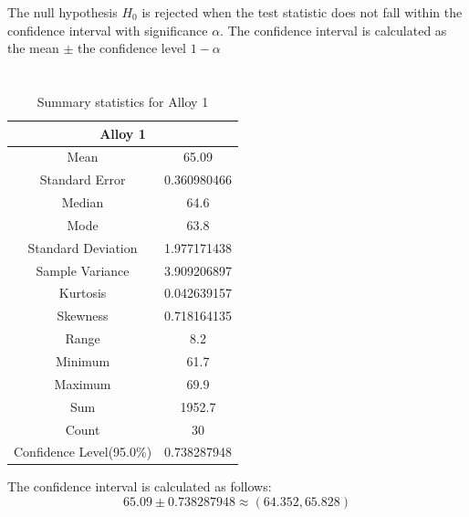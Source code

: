 \documentclass[letterpaper]{article}
\begin{document}
The null hypothesis $H_0$ is rejected when the test statistic
does not fall within the confidence interval with significance $\alpha$.
The confidence interval is calculated as the mean $\pm$ the confidence level $1-\alpha$


\section{}%
\subsection{}%

\begin{table}[H]
 \centering
 \begin{tabular}{|c|c|}
  \hline
  \multicolumn{2}{|c|}{Alloy 1}          \\ \hline
  Mean                     & 65.09       \\ \hline
  Standard Error           & 0.360980466 \\ \hline
  Median                   & 64.6        \\ \hline
  Mode                     & 63.8        \\ \hline
  Standard Deviation       & 1.977171438 \\ \hline
  Sample Variance          & 3.909206897 \\ \hline
  Kurtosis                 & 0.042639157 \\ \hline
  Skewness                 & 0.718164135 \\ \hline
  Range                    & 8.2         \\ \hline
  Minimum                  & 61.7        \\ \hline
  Maximum                  & 69.9        \\ \hline
  Sum                      & 1952.7      \\ \hline
  Count                    & 30          \\ \hline
  Confidence Level(95.0\%) & 0.738287948 \\ \hline
 \end{tabular}
 \caption{Summary statistics for Alloy 1}
 \label{3a1}
\end{table}

The confidence interval is calculated as follows:
$$65.09 \pm 0.738287948 \approx (64.352, 65.828)$$
\end{document}
